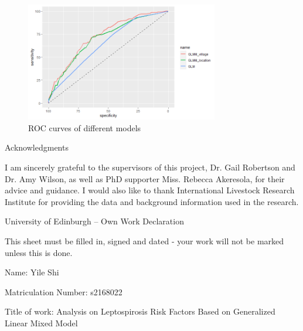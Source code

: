 \documentclass[11pt,twoside]{article}
\numberwithin{Theorem}{section}
\numberwithin{Definition}{section}
\numberwithin{Lemma}{section}
\numberwithin{Algorithm}{section}
\numberwithin{equation}{section}
\begin{document}
\begin{figure}[!h]
	\centering
	\includegraphics[width = 0.75\textwidth]{Images/ROC.png}
	\caption{ROC curves of different models}
	\label{fig:ROC}
\end{figure}

\clearpage

\begin{center}
\Large{Acknowledgments}
\end{center}

I am sincerely grateful to the supervisors of this project, Dr. Gail Robertson and Dr. Amy Wilson, as well as PhD supporter Miss. Rebecca Akeresola, for their advice and guidance. I would also like to thank International Livestock Research Institute for providing the data and background information used in the research. 

\clearpage


\begin{center}
\Large{University of Edinburgh – Own Work Declaration}
\end{center}

This sheet must be filled in, signed and dated - your work will not be marked unless this is done.
\vspace{1cm}

Name: Yile Shi

Matriculation Number: s2168022

Title of work: Analysis on Leptospirosis Risk Factors Based on Generalized Linear Mixed Model

\vspace{1cm}
\end{document}
